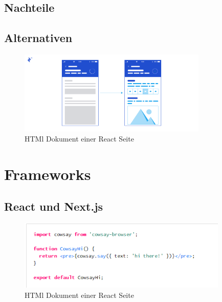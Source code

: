\documentclass[runningheads]{llncs}
\begin{document}
\subsection{Nachteile}
\label{subsec:Nachteile}

\subsection{Alternativen}
\label{subsec:Alternativen}

\begin{figure}[h]
  \centering
  \includegraphics[width=9cm]{images/WebsiteSceleton}
  \caption{HTMl Dokument einer React Seite}
\end{figure}

\newpage

\section{Frameworks}
\label{sec:Evaluation}

\subsection{React und Next.js}
\label{subsec:React und Next.js}

\begin{figure}
  \centering
  \includegraphics[width=10cm]{images/CodeSplitting}
  \caption{HTMl Dokument einer React Seite}
\end{figure}
\end{document}
